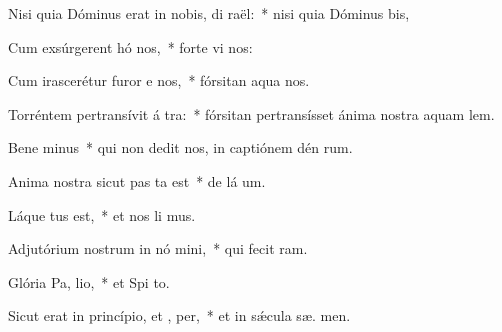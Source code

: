 \item Nisi quia Dóminus erat in nobis, di  raël:~* nisi quia Dóminus   bis,
\item Cum exsúrgerent hó  nos,~* forte vi  nos:
\item Cum irascerétur furor e  nos,~* fórsitan aqua  nos.
\item Torréntem pertransívit á tra:~* fórsitan pertransísset ánima nostra aquam lem.
\item Bene minus~* qui non dedit nos, in captiónem dén rum.
\item Anima nostra sicut pas ta est~* de lá um.
\item Láque tus est,~* et nos li mus.
\item Adjutórium nostrum in nó mini,~* qui fecit   ram.
\item Glória Pa,  lio,~* et Spi to.
\item Sicut erat in princípio, et ,  per,~* et in sǽcula sæ. men.
